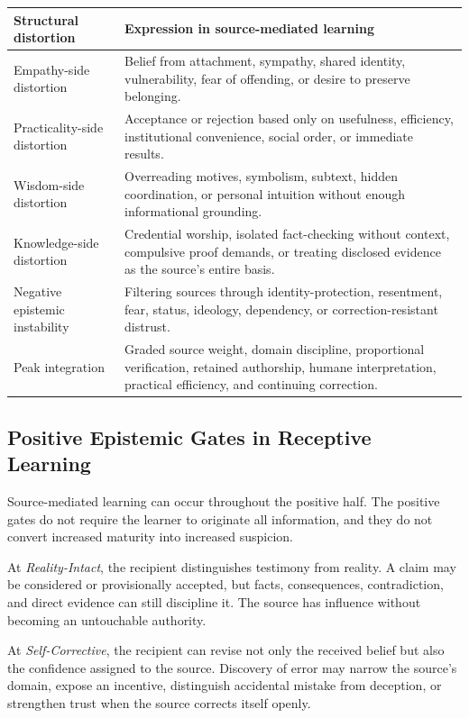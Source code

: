 \documentclass[11pt]{article}
\begin{document}
\begin{center}
\begin{tabular}{>{\raggedright\arraybackslash}p{4.1cm} >{\raggedright\arraybackslash}p{9.1cm}}
\toprule
Structural distortion & Expression in source-mediated learning \\
\midrule
Empathy-side distortion & Belief from attachment, sympathy, shared identity, vulnerability, fear of offending, or desire to preserve belonging. \\
Practicality-side distortion & Acceptance or rejection based only on usefulness, efficiency, institutional convenience, social order, or immediate results. \\
Wisdom-side distortion & Overreading motives, symbolism, subtext, hidden coordination, or personal intuition without enough informational grounding. \\
Knowledge-side distortion & Credential worship, isolated fact-checking without context, compulsive proof demands, or treating disclosed evidence as the source's entire basis. \\
Negative epistemic instability & Filtering sources through identity-protection, resentment, fear, status, ideology, dependency, or correction-resistant distrust. \\
Peak integration & Graded source weight, domain discipline, proportional verification, retained authorship, humane interpretation, practical efficiency, and continuing correction. \\
\bottomrule
\end{tabular}
\end{center}

\subsection{Positive Epistemic Gates in Receptive Learning}

Source-mediated learning can occur throughout the positive half. The positive gates do not require the learner to originate all information, and they do not convert increased maturity into increased suspicion.

At \emph{Reality-Intact}, the recipient distinguishes testimony from reality. A claim may be considered or provisionally accepted, but facts, consequences, contradiction, and direct evidence can still discipline it. The source has influence without becoming an untouchable authority.

At \emph{Self-Corrective}, the recipient can revise not only the received belief but also the confidence assigned to the source. Discovery of error may narrow the source's domain, expose an incentive, distinguish accidental mistake from deception, or strengthen trust when the source corrects itself openly.
\end{document}
